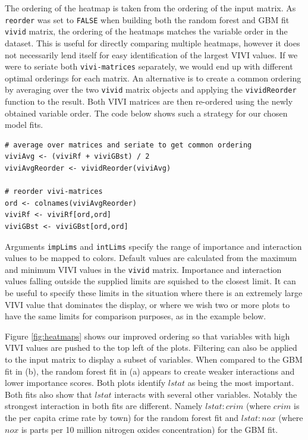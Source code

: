 The ordering of the heatmap is taken from the ordering of the input matrix. As \texttt{reorder} was set to \texttt{FALSE} when building both the random forest and GBM fit \texttt{vivid} matrix, the ordering of the heatmaps matches the variable order in the dataset. This is useful for directly comparing multiple heatmaps, however it does not necessarily lend itself for easy identification of the largest VIVI values. If we were to seriate both \texttt{vivi-matrices} separately, we would end up with different optimal orderings for each matrix. An alternative is to create a common ordering by averaging over the two \texttt{vivid} matrix objects and applying the \texttt{vividReorder} function to the result. Both VIVI matrices are then re-ordered using the newly obtained variable order. The code below shows such a strategy for our chosen model fits.

\begin{verbatim}
# average over matrices and seriate to get common ordering
viviAvg <- (viviRf + viviGBst) / 2
viviAvgReorder <- vividReorder(viviAvg)

# reorder vivi-matrices 
ord <- colnames(viviAvgReorder)
viviRf <- viviRf[ord,ord]
viviGBst <- viviGBst[ord,ord]
\end{verbatim}

Arguments \texttt{impLims} and \texttt{intLims} specify the range of importance and interaction values to be mapped to colors. Default values are calculated from the maximum and minimum VIVI values in the \texttt{vivid} matrix. Importance and interaction values falling outside the supplied limits are squished to the closest limit. It can be useful to specify these limits in the situation where there is an extremely large VIVI value that dominates the display, or where we wish two or more plots to have the same limits for comparison purposes, as in the example below.

Figure \ref{fig:heatmaps} shows our improved ordering so that variables with high VIVI values are pushed to the top left of the plots. Filtering can also be applied to the input matrix to display a subset of variables. When compared to the GBM fit in (b), the random forest fit in (a) appears to create weaker interactions and lower importance scores. Both plots identify \(lstat\) as being the most important. Both fits also show that \(lstat\) interacts with several other variables. Notably the strongest interaction in both fits are different. Namely \(lstat:crim\) (where \(crim\) is the per capita crime rate by town) for the random forest fit and \(lstat:nox\) (where \(nox\) is parts per 10 million nitrogen oxides concentration) for the GBM fit.

